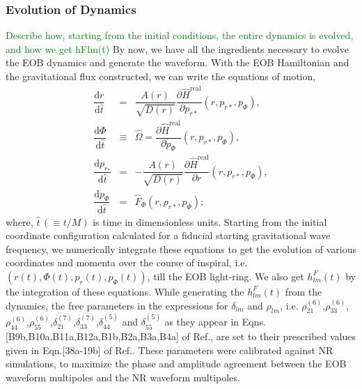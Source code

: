 \documentclass[aps,
prd,
amsmath,
amssymb,
twocolumn,
floatfix,
groupedaddress]{revtex4-1}
\newcommand{\D}{\mathrm{d}}
\newcommand{\real}{\mathrm{real}}
\begin{document}
\subsubsection{Evolution of Dynamics}\label{sec:level3:DynamicalEvolution}
\textcolor{green}{Describe how, starting from the initial conditions, the entire dynamics is evolved, and how we get hFlm(t)}
By now, we have all the ingredients necessary to evolve the EOB dynamics and generate the waveform. With the EOB Hamiltonian and the gravitational flux constructed, we can write the equations of motion,
\begin{eqnarray}
\dfrac{\D r}{\D\hat{t}} &=& \dfrac{A(r)}{\sqrt{D(r)}}\dfrac{\partial \hat{H}^{\real}}{\partial p_{r*}} (r, p_{r*}, p_{\Phi}) ,\\
\dfrac{\D\Phi}{\D\hat{t}} &\equiv & \hat{\Omega} = \dfrac{\partial \hat{H}^{\real}}{\partial p_{\Phi}} (r, p_{r*}, p_{\Phi}) , \\ 
\dfrac{\D p_{r_*}}{\D\hat{t}} &=& -\dfrac{A(r)}{\sqrt{D(r)}} \dfrac{\partial \hat{H}^{\real}}{\partial r} (r, p_{r*}, p_{\Phi}) ,\\
\dfrac{\D p_{\Phi}}{\D\hat{t}} &=& \hat{F}_{\Phi}(r, p_{r*}, p_{\Phi}) ;
\end{eqnarray}
where, $\hat{t}\,(\equiv t/M)$ is time in dimensionless units. Starting from the initial coordinate configuration calculated for a fiducial starting gravitational wave frequency, we numerically integrate these equations to get the evolution of various coordinates and momenta over the course of inspiral, i.e.$(r(t),\Phi(t),p_r(t),p_{\Phi}(t))$, till the EOB light-ring. We also get $h^F_{lm}(t)$ by the integration of these equations. While generating the $h^F_{lm}(t)$ from the dynamics, the free parameters in the expressions for $\delta_{lm}$ and $\rho_{lm}$, i.e. $\rho^{(6)}_{21}$,$\rho^{(6)}_{33}$,$\rho^{(6)}_{44}$,$\rho^{(6)}_{55}$,$\delta^{(7)}_{21}$,$\delta^{(7)}_{33}$,$\delta^{(5)}_{44}$ and $\delta^{(5)}_{55}$ as they appear in Eqns.[B9b,B10a,B11a,B12a,B1b,B2a,B3a,B4a] of Ref.\citep{BuonannoEOBv2Main}, are set to their prescribed values given in Eqn.[38a-19b] of Ref.\citep{BuonannoEOBv2Main}. These parameters were calibrated against NR simulations, to maximize the phase and amplitude agreement between 
the EOB waveform multipoles and the NR waveform multipoles.
\end{document}
